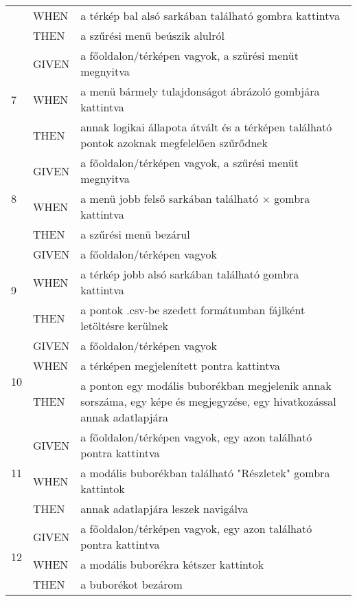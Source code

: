 \begin{center}
\begin{longtable}{ | m{}| m{} | m{} | }
		\cline{2-3}
		& WHEN & a térkép bal alsó sarkában található \faIcon{filter} gombra kattintva \\
		\cline{2-3}
		& THEN & a szűrési menü beúszik alulról \\
		\hline
		\multirow{3}{*}{7} & GIVEN & a főoldalon/térképen vagyok, a szűrési menüt megnyitva \\
		\cline{2-3}
		& WHEN & a menü bármely tulajdonságot ábrázoló gombjára kattintva \\
		\cline{2-3}
		& THEN & annak logikai állapota átvált és a térképen található pontok azoknak megfelelően szűrődnek \\
		\hline
		\multirow{3}{*}{8} & GIVEN & a főoldalon/térképen vagyok, a szűrési menüt megnyitva \\
		\cline{2-3}
		& WHEN & a menü jobb felső sarkában található $\times$ gombra kattintva \\
		\cline{2-3}
		& THEN & a szűrési menü bezárul \\
		\hline
		\multirow{3}{*}{9} & GIVEN & a főoldalon/térképen vagyok \\
		\cline{2-3}
		& WHEN & a térkép jobb alsó sarkában található \faIcon{download} gombra kattintva \\
		\cline{2-3}
		& THEN & a pontok .csv-be szedett formátumban fájlként letöltésre kerülnek \\
		\hline
		\multirow{3}{*}{10} & GIVEN & a főoldalon/térképen vagyok \\
		\cline{2-3}
		& WHEN & a térképen megjelenített pontra kattintva \\
		\cline{2-3}
		& THEN & a ponton egy modális buborékban megjelenik annak sorszáma, egy képe és megjegyzése, egy hivatkozással annak adatlapjára \\
		\hline
		\multirow{3}{*}{11} & GIVEN & a főoldalon/térképen vagyok, egy azon található pontra kattintva \\
		\cline{2-3}
		& WHEN & a modális buborékban található "Részletek" gombra kattintok \\
		\cline{2-3}
		& THEN & annak adatlapjára leszek navigálva \\
		\hline
		\multirow{3}{*}{12} & GIVEN & a főoldalon/térképen vagyok, egy azon található pontra kattintva \\
		\cline{2-3}
		& WHEN & a modális buborékra kétszer kattintok \\
		\cline{2-3}
		& THEN & a buborékot bezárom \\
		\hline
	\end{longtable}
	\label{tab:sim_guest_map}
\end{center}

